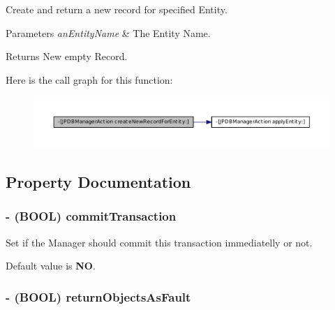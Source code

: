 Create and return a new record for specified Entity. 


\begin{DoxyParams}{Parameters}
{\em anEntityName} & The Entity Name. \\
\hline
\end{DoxyParams}
\begin{DoxyReturn}{Returns}
New empty Record. 
\end{DoxyReturn}


Here is the call graph for this function:
\nopagebreak
\begin{figure}[H]
\begin{center}
\leavevmode
\includegraphics[width=400pt]{interface_j_p_d_b_manager_action_a64efbdc0e61408df85b45629141871e6_cgraph}
\end{center}
\end{figure}




\subsection{Property Documentation}
\hypertarget{interface_j_p_d_b_manager_action_ad0060c13ad4e89eb23c60ad123250505}{
\subsubsection[{commitTransaction}]{\setlength{\rightskip}{0pt plus 5cm}-\/ (BOOL) commitTransaction}}
\label{interface_j_p_d_b_manager_action_ad0060c13ad4e89eb23c60ad123250505}


Set if the Manager should commit this transaction immediatelly or not. 

\par
 Default value is {\bfseries NO}. \hypertarget{interface_j_p_d_b_manager_action_ae603fd48edaea29a115b90a19f440ab8}{
\subsubsection[{returnObjectsAsFault}]{\setlength{\rightskip}{0pt plus 5cm}-\/ (BOOL) returnObjectsAsFault}}
\label{interface_j_p_d_b_manager_action_ae603fd48edaea29a115b90a19f440ab8}


